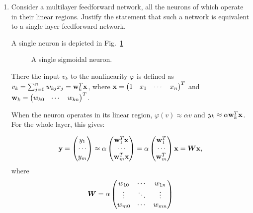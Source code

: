 \documentclass{exercise}
\begin{document}
\begin{enumerate}
\begin{solution}
\begin{enumerate}
    \end{enumerate}

  \end{solution}
  

\item

  Consider a multilayer feedforward network, all the neurons of which
  operate in their linear regions. Justify the statement that such a
  network is equivalent to a single-layer feedforward network.

  \begin{solution}
    A single neuron is depicted in Fig.~\ref{fig:singleneuron}


    \begin{figure}[hb]
      \begin{center}
        
        \caption{\label{fig:singleneuron} A single sigmoidal neuron.}
      \end{center}
    \end{figure}
    
    There the input $v_k$ to the nonlinearity $\varphi$ is defined as
    $v_k = \sum_{j = 0}^n w_{kj}x_j = {\bf{w}}_k^T {\bf{x}}$, \newline
    where ${\bf{x}}=\begin{pmatrix} 1 & x_1 &\cdots & x_n
    \end{pmatrix}^T$ and ${\bf{w}}_k=\begin{pmatrix} w_{k0} &\cdots &
      w_{kn} \end{pmatrix}^T$.

    When the neuron operates in its linear region, $\varphi(v) \approx
    \alpha v$ and $y_k \approx \alpha {\bf{w}}_k^T {\bf{x}}$. For the
    whole layer, this gives: 

    \begin{equation}
      {\bf{y}} = \begin{pmatrix}  y_1 \\ \cdots \\ y_m \end{pmatrix}
      \approx \alpha \begin{pmatrix}  {\bf{w}}_1^T {\bf{x}}\\ \cdots \\
        {\bf{w}}_m^T {\bf{x}} \end{pmatrix} 
      = \alpha \begin{pmatrix}  {\bf{w}}_1^T\\ \cdots \\
        {\bf{w}}_m^T \end{pmatrix} {\bf{x}} = \boldsymbol{W} {\bf{x}},
    \end{equation}
    where
    \begin{equation}
      \boldsymbol{W} = \alpha \begin{pmatrix}
        w_{10} & \cdots & w_{1n} \\ \vdots & \ddots & \vdots \\
        w_{m0} & \cdots & w_{mn} 
      \end{pmatrix}
    \end{equation}
    

\end{solution}
\end{enumerate}
\end{document}
